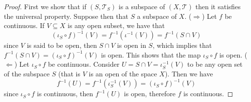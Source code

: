 \begin{proof}
  First we show that if \((S, \mathcal T_S)\) is a subspace of \((X, \mathcal{T})\) then
  it satisfies the universal property. Suppose then that \(S\) a subspace of
  \(X\). (\(\Rightarrow\)) Let \(f\) be continuous. If \(V \subseteq X\) is any open subset, we have
  that
  \[
    (\iota_S \circ f)^{-1}(V) = f^{-1}(\iota^{-1}(V)) = f^{-1}(S \cap V)
  \]
  since \(V\) is said to be open, then \(S \cap V\) is open in \(S\), which
  implies that \(f^{-1}(S \cap V) = (\iota_S \circ f)^{-1}(V)\) is open. This
  shows that the map \(\iota_S \circ f\) is open. (\(\Leftarrow\)) Let \(\iota_S
  \circ f\) be continuous. Consider \(U = S \cap V = \iota_S^{-1}(V)\) to be any
  open set of the subspace \(S\) (that is \(V\) is an open of the space \(X\)).
  Then we have
  \[
    f^{-1}(U) = f^{-1}(\iota_S^{-1}(V)) = (\iota_S \circ f)^{-1}(V)
  \]
  since \(\iota_S \circ f\) is continuous, then \(f^{-1}(U)\) is open, therefore
  \(f\) is continuous.


\end{proof}
